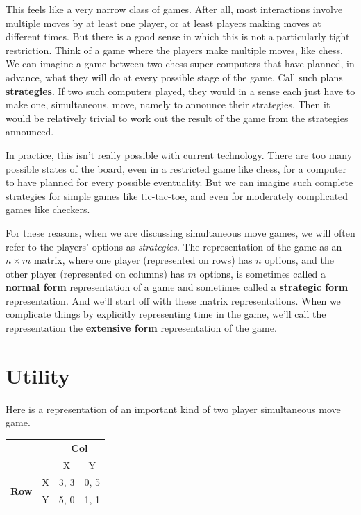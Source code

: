\documentclass[openany]{book}
\begin{document}
This feels like a very narrow class of games. After all, most interactions involve multiple moves by at least one player, or at least players making moves at different times. But there is a good sense in which this is not a particularly tight restriction. Think of a game where the players make multiple moves, like chess. We can imagine a game between two chess super-computers that have planned, in advance, what they will do at every possible stage of the game. Call such plans \textbf{strategies}. If two such computers played, they would in a sense each just have to make one, simultaneous, move, namely to announce their strategies. Then it would be relatively trivial to work out the result of the game from the strategies announced.

In practice, this isn't really possible with current technology. There are too many possible states of the board, even in a restricted game like chess, for a computer to have planned for every possible eventuality. But we can imagine such complete strategies for simple games like tic-tac-toe, and even for moderately complicated games like checkers. 

For these reasons, when we are discussing simultaneous move games, we will often refer to the players' options as \textit{strategies}. The representation of the game as an $n \times m$ matrix, where one player (represented on rows) has $n$ options, and the other player (represented on columns) has $m$ options, is sometimes called a \textbf{normal form} representation of a game and sometimes called a \textbf{strategic form} representation. And we'll start off with these matrix representations. When we complicate things by explicitly representing time in the game, we'll call the representation the \textbf{extensive form} representation of the game.

\section{Utility}
Here is a representation of an important kind of two player simultaneous move game.

\begin{center}
\begin{tabular}{l r | c c}
 & & \multicolumn{2}{c}{\textbf{Col}} \\
& & X & Y \\ \hline
\multirow{2}{*}{\textbf{Row}} & X & 3, 3 & 0, 5 \\ & Y & 5, 0 & 1, 1 \\
\end{tabular}
\end{center}
\end{document}
